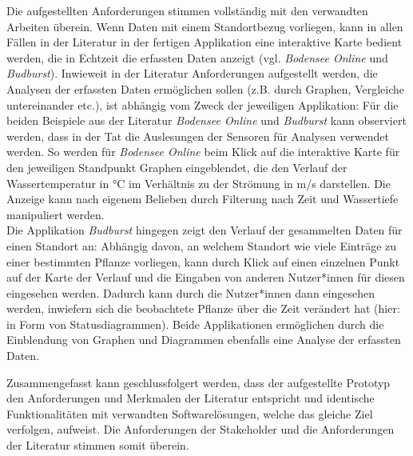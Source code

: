 Die aufgestellten Anforderungen stimmen vollständig mit den verwandten Arbeiten überein. Wenn Daten mit einem Standortbezug vorliegen, kann in allen Fällen in der Literatur in der fertigen Applikation eine interaktive Karte bedient werden, die in Echtzeit die erfassten Daten anzeigt (vgl. \textit{Bodensee Online} und \textit{Budburst}). Inwieweit in der Literatur Anforderungen aufgestellt werden, die Analysen der erfassten Daten ermöglichen sollen (z.B. durch Graphen, Vergleiche untereinander etc.), ist abhängig vom Zweck der jeweiligen Applikation: Für die beiden Beispiele aus der Literatur \textit{Bodensee Online} und \textit{Budburst} kann observiert werden, dass in der Tat die Auslesungen der Sensoren für Analysen verwendet werden. So werden für \textit{Bodensee Online} beim Klick auf die interaktive Karte für den jeweiligen Standpunkt Graphen eingeblendet, die den Verlauf der Wassertemperatur in °C im Verhältnis zu der Strömung in m/s darstellen. Die Anzeige kann nach eigenem Belieben durch Filterung nach Zeit und Wassertiefe manipuliert werden. \\ Die Applikation \textit{Budburst} hingegen zeigt den Verlauf der gesammelten Daten für einen Standort an: Abhängig davon, an welchem Standort wie viele Einträge zu einer bestimmten Pflanze vorliegen, kann durch Klick auf einen einzelnen Punkt auf der Karte der Verlauf und die Eingaben von anderen Nutzer*innen für diesen eingesehen werden. Dadurch kann durch die Nutzer*innen dann eingesehen werden, inwiefern sich die beobachtete Pflanze über die Zeit verändert hat (hier: in Form von Statusdiagrammen). Beide Applikationen ermöglichen durch die Einblendung von Graphen und Diagrammen ebenfalls eine Analyse der erfassten Daten. 

Zusammengefasst kann geschlussfolgert werden, dass der aufgestellte Prototyp den Anforderungen und Merkmalen der Literatur entspricht und identische Funktionalitäten mit verwandten Softwarelösungen, welche das gleiche Ziel verfolgen, aufweist. Die Anforderungen der Stakeholder und die Anforderungen der Literatur stimmen somit überein.

